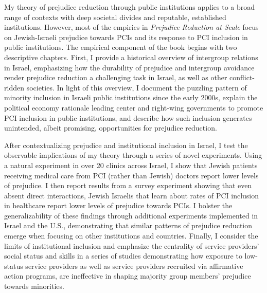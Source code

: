 \documentclass[12pt]{article}
\theoremstyle{plain}
\begin{document}
My theory of prejudice reduction through public institutions applies to a broad range of contexts with deep societal divides and reputable, established institutions. However, most of the empirics in \emph{Prejudice Reduction at Scale} focus on Jewish-Israeli prejudice towards PCIs and its response to PCI inclusion in public institutions. The empirical component of the book begins with two descriptive chapters. First, I provide a historical overview of intergroup relations in Israel, emphasizing how the durability of prejudice and intergroup avoidance render prejudice reduction a challenging task in Israel, as well as other conflict-ridden societies. In light of this overview, I document the puzzling pattern of minority inclusion in Israeli public institutions since the early 2000s, explain the political economy rationale leading center and right-wing governments to promote PCI inclusion in public institutions, and describe how such inclusion generates unintended, albeit promising, opportunities for prejudice reduction.

After contextualizing prejudice and institutional inclusion in Israel, I test the observable implications of my theory through a series of novel experiments. Using a natural experiment in over 20 clinics across Israel, I show that Jewish patients receiving medical care from PCI (rather than Jewish) doctors report lower levels of prejudice. I then report results from a survey experiment showing that even absent direct interactions, Jewish Israelis that learn about rates of PCI inclusion in healthcare report lower levels of prejudice towards PCIs. I bolster the generalizability of these findings through additional experiments implemented in Israel and the U.S., demonstrating that similar patterns of prejudice reduction emerge when focusing on other institutions and countries. Finally, I consider the limits of institutional inclusion and emphasize the centrality of service providers' social status and skills in a series of studies demonstrating how exposure to low-status service providers as well as service providers recruited via affirmative action programs, are ineffective in shaping majority group members' prejudice towards minorities. 
\end{document}
